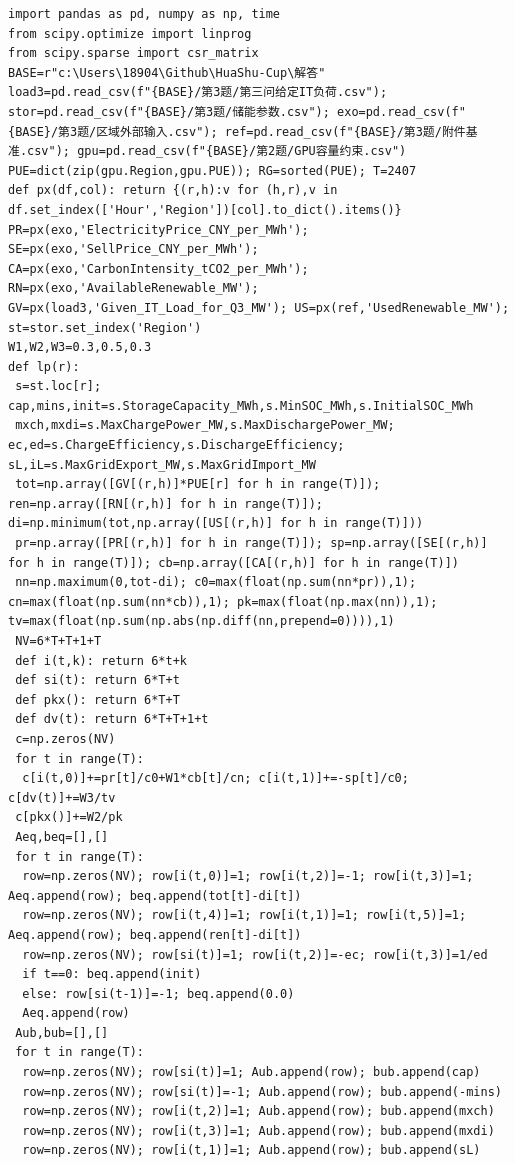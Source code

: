 \documentclass{article}
\begin{document}
\begin{lstlisting}
import pandas as pd, numpy as np, time
from scipy.optimize import linprog
from scipy.sparse import csr_matrix
BASE=r"c:\Users\18904\Github\HuaShu-Cup\解答"
load3=pd.read_csv(f"{BASE}/第3题/第三问给定IT负荷.csv"); stor=pd.read_csv(f"{BASE}/第3题/储能参数.csv"); exo=pd.read_csv(f"{BASE}/第3题/区域外部输入.csv"); ref=pd.read_csv(f"{BASE}/第3题/附件基准.csv"); gpu=pd.read_csv(f"{BASE}/第2题/GPU容量约束.csv")
PUE=dict(zip(gpu.Region,gpu.PUE)); RG=sorted(PUE); T=2407
def px(df,col): return {(r,h):v for (h,r),v in df.set_index(['Hour','Region'])[col].to_dict().items()}
PR=px(exo,'ElectricityPrice_CNY_per_MWh'); SE=px(exo,'SellPrice_CNY_per_MWh'); CA=px(exo,'CarbonIntensity_tCO2_per_MWh'); RN=px(exo,'AvailableRenewable_MW'); GV=px(load3,'Given_IT_Load_for_Q3_MW'); US=px(ref,'UsedRenewable_MW'); st=stor.set_index('Region')
W1,W2,W3=0.3,0.5,0.3
def lp(r):
 s=st.loc[r]; cap,mins,init=s.StorageCapacity_MWh,s.MinSOC_MWh,s.InitialSOC_MWh
 mxch,mxdi=s.MaxChargePower_MW,s.MaxDischargePower_MW; ec,ed=s.ChargeEfficiency,s.DischargeEfficiency; sL,iL=s.MaxGridExport_MW,s.MaxGridImport_MW
 tot=np.array([GV[(r,h)]*PUE[r] for h in range(T)]); ren=np.array([RN[(r,h)] for h in range(T)]); di=np.minimum(tot,np.array([US[(r,h)] for h in range(T)]))
 pr=np.array([PR[(r,h)] for h in range(T)]); sp=np.array([SE[(r,h)] for h in range(T)]); cb=np.array([CA[(r,h)] for h in range(T)])
 nn=np.maximum(0,tot-di); c0=max(float(np.sum(nn*pr)),1); cn=max(float(np.sum(nn*cb)),1); pk=max(float(np.max(nn)),1); tv=max(float(np.sum(np.abs(np.diff(nn,prepend=0)))),1)
 NV=6*T+T+1+T
 def i(t,k): return 6*t+k
 def si(t): return 6*T+t
 def pkx(): return 6*T+T
 def dv(t): return 6*T+T+1+t
 c=np.zeros(NV)
 for t in range(T):
  c[i(t,0)]+=pr[t]/c0+W1*cb[t]/cn; c[i(t,1)]+=-sp[t]/c0; c[dv(t)]+=W3/tv
 c[pkx()]+=W2/pk
 Aeq,beq=[],[]
 for t in range(T):
  row=np.zeros(NV); row[i(t,0)]=1; row[i(t,2)]=-1; row[i(t,3)]=1; Aeq.append(row); beq.append(tot[t]-di[t])
  row=np.zeros(NV); row[i(t,4)]=1; row[i(t,1)]=1; row[i(t,5)]=1; Aeq.append(row); beq.append(ren[t]-di[t])
  row=np.zeros(NV); row[si(t)]=1; row[i(t,2)]=-ec; row[i(t,3)]=1/ed
  if t==0: beq.append(init)
  else: row[si(t-1)]=-1; beq.append(0.0)
  Aeq.append(row)
 Aub,bub=[],[]
 for t in range(T):
  row=np.zeros(NV); row[si(t)]=1; Aub.append(row); bub.append(cap)
  row=np.zeros(NV); row[si(t)]=-1; Aub.append(row); bub.append(-mins)
  row=np.zeros(NV); row[i(t,2)]=1; Aub.append(row); bub.append(mxch)
  row=np.zeros(NV); row[i(t,3)]=1; Aub.append(row); bub.append(mxdi)
  row=np.zeros(NV); row[i(t,1)]=1; Aub.append(row); bub.append(sL)

\end{lstlisting}
\end{document}

